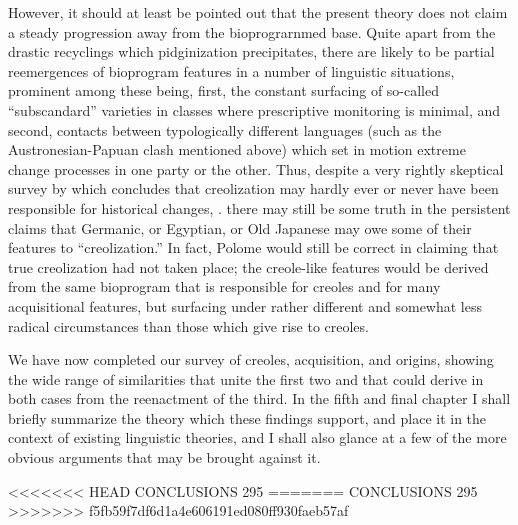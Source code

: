 However, it should at least be pointed out that the present theory does not claim a steady progression away from the biopro\-grarnmed base. Quite apart from the drastic recyclings which pidginiza\-tion precipitates, there are likely to be partial reemergences of bio\-program features in a number of linguistic situations, prominent among these being, first, the constant surfacing of so-called ``subscandard'' varieties in classes where prescriptive monitoring is minimal, and second, contacts between typologically different languages (such as the Austronesian-Papuan clash mentioned above) which set in motion extreme change processes in one party or the other. Thus, despite a very rightly skeptical survey by \citet{Polome1980} which concludes that creolization may hardly ever or never have been responsible for histo\-rical changes, . there may still be some truth in the persistent claims that Germanic, or Egyptian, or Old Japanese may owe some of their features to ``creolization.'' In fact, Polome would still be correct in claiming that true creolization had not taken place; the creole-like features would be derived from the same bioprogram that is responsible for creoles and for many acquisitional features, but surfacing under rather different and somewhat less radical circumstances than those which give rise to creoles.

We have now completed our survey of creoles, acquisition, and origins, showing the wide range of similarities that unite the first two and that could derive in both cases from the reenactment of the third. In the fifth and final chapter I shall briefly summarize the theory which these findings support, and place it in the context of existing linguistic theories, and I shall also glance at a few of the more obvious arguments that may be brought against it.

<<<<<<< HEAD
CONCLUSIONS 295
=======
CONCLUSIONS 295
>>>>>>> f5fb59f7df6d1a4e606191ed080ff930faeb57af
